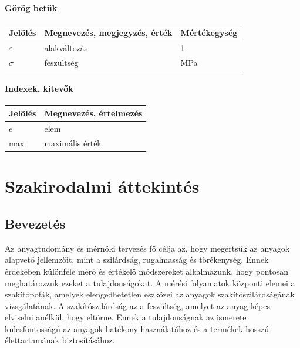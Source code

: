 \documentclass[12pt,a4paper,oneside]{report}
\begin{document}
\subsubsection*{Görög betűk}
\begin{center}
    \begin{tabular}{lp{10cm}l}
        \hline
        Jelölés & Megnevezés, megjegyzés, érték & Mértékegység \\ 
        \hline
                $\varepsilon$  & alakváltozás           & 1    \\
        $\sigma$  & feszültség                  & MPa             \\      

        \hline
    \end{tabular}
\end{center}



\subsubsection*{Indexek, kitevők}
\begin{center}
    \begin{tabular}{lp{12.8cm}}
        \hline
        Jelölés & Megnevezés, értelmezés\\ 
        \hline
        $e$     & elem  \\
        max     & maximális érték        \\
        \hline
    \end{tabular}    
\end{center}


\def\arraystretch{1}%

\cleardoublepage
{}
\chapter{Szakirodalmi áttekintés}
\section{Bevezetés}
Az anyagtudomány és mérnöki tervezés fő célja az, hogy megértsük az anyagok alapvető jellemzőit, mint a szilárdság, rugalmasság és törékenység. Ennek érdekében különféle mérő és értékelő módszereket alkalmazunk, hogy pontosan meghatározzuk ezeket a tulajdonságokat. A mérési folyamatok központi elemei a szakítópofák, amelyek elengedhetetlen eszközei az anyagok szakítószilárdságának vizsgálatának. A szakítószilárdság az a feszültség, amelyet az anyag képes elviselni anélkül, hogy eltörne. Ennek a tulajdonságnak az ismerete kulcsfontosságú az anyagok hatékony használatához és a termékek hosszú élettartamának biztosításához.
\end{document}
